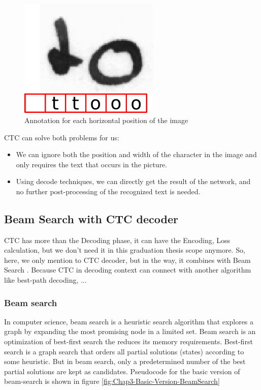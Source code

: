 \begin{figure}[H]
	\centering
	\includegraphics[width=0.6\textwidth]{img/Chap3/Annotation-image-CTC}
	\caption{ Annotation for each horizontal position of the image }
	\label{fig:Chap3-Annottion-image-CTC}
\end{figure}

CTC can solve both problems for us:
\begin{itemize}
	\item We can ignore both the position and width of the character in the image and only requires the text that occurs in the picture.
	\item Using decode techniques, we can directly get the result of the network, and no further post-processing of the recognized text is needed.
\end{itemize}

\subsection{Beam Search with CTC decoder}
CTC has more than the Decoding phase, it can have the Encoding, Loss calculation, but we don't need it in this graduation thesis scope anymore. So, here, we only mention to CTC decoder, but in the way, it combines with Beam Search \cite{scheidl2018word}. Because CTC in decoding context can connect with another algorithm like best-path decoding, ...

\subsubsection{Beam search}

In computer science, beam search \cite{BeamSearch} is a heuristic search algorithm that explores a graph by expanding the most promising node in a limited set. Beam search is an optimization of best-first search the reduces its memory requirements. Best-first search is a graph search that orders all partial solutions (states) according to some heuristic. But in beam search, only a predetermined number of the best partial solutions are kept as candidates. Pseudocode for the basic version of beam-search is shown in figure \ref{fig:Chap3-Basic-Version-BeamSearch}

